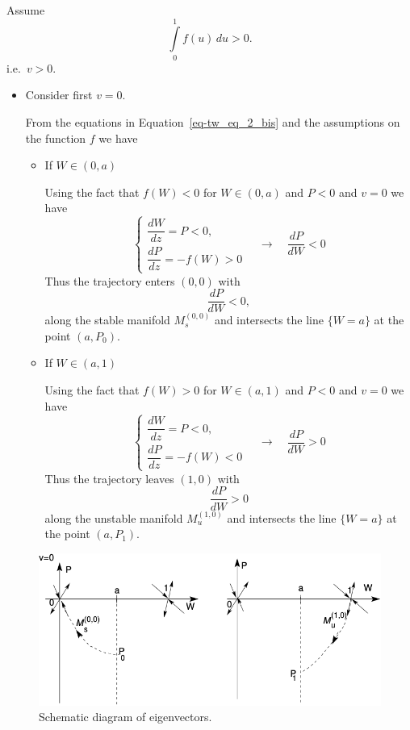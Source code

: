 \documentclass[
  letterpaper,
  DIV=11,
  numbers=noendperiod]{scrreprt}
\theoremstyle{definition}
\theoremstyle{plain}
\theoremstyle{plain}
\theoremstyle{remark}
\begin{document}
Assume \[
 \int\limits_{0}^{1}f(u) \, du > 0.
\] i.e.~\(v>0\).

\begin{itemize}
\item
  Consider first \(v=0\).

  From the equations in Equation~\ref{eq-tw_eq_2_bis} and the
  assumptions on the function \(f\) we have

  \begin{itemize}
  \item
    If \(W \in (0,a)\)

    Using the fact that \(f(W) <0\) for \(W \in (0,a)\) and \(P<0\) and
    \(v=0\) we have \[        
      \begin{cases}
      \dfrac{dW}{dz} = P <0, \\
      \dfrac{dP}{dz} = - f(W) >0
      \end{cases}  \quad  \rightarrow \quad \dfrac{dP}{dW} <0
      \] Thus the trajectory enters \((0,0)\) with \[ 
    \dfrac{dP}{dW} <0,
    \] along the stable manifold \(\textit{M}_s^{(0,0)}\) and intersects
    the line \(\{ W=a\}\) at the point \((a, P_0)\).
  \item
    If \(W \in (a,1)\)

    Using the fact that \(f(W) >0\) for \(W \in (a,1)\) and \(P<0\) and
    \(v=0\) we have \[
      \begin{cases}
      \dfrac{dW}{dz} = P <0, \\
      \dfrac{dP}{dz} = - f(W) <0
      \end{cases}  \quad  \rightarrow \quad \dfrac{dP}{dW} >0
      \] Thus the trajectory leaves \((1,0)\) with \[
       \dfrac{dP}{dW} >0
      \] along the unstable manifold \(\textit{M}_u^{(1,0)}\) and
    intersects the line \(\{ W=a\}\) at the point \((a, P_1)\).
  \end{itemize}
\end{itemize}

\begin{figure}

{\centering \includegraphics{fig1.png}

}

\caption{\label{fig-shooting}Schematic diagram of eigenvectors.}

\end{figure}
\end{document}
